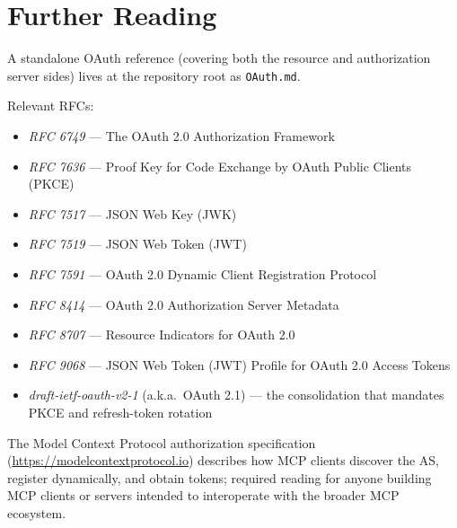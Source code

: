 \section{Further Reading}
\label{sec:as-references}

A standalone OAuth reference (covering both the resource and authorization server sides) lives at the repository root as \texttt{OAuth.md}.

Relevant RFCs:

\begin{itemize}
  \item \emph{RFC 6749} --- The OAuth 2.0 Authorization Framework
  \item \emph{RFC 7636} --- Proof Key for Code Exchange by OAuth Public Clients (PKCE)
  \item \emph{RFC 7517} --- JSON Web Key (JWK)
  \item \emph{RFC 7519} --- JSON Web Token (JWT)
  \item \emph{RFC 7591} --- OAuth 2.0 Dynamic Client Registration Protocol
  \item \emph{RFC 8414} --- OAuth 2.0 Authorization Server Metadata
  \item \emph{RFC 8707} --- Resource Indicators for OAuth 2.0
  \item \emph{RFC 9068} --- JSON Web Token (JWT) Profile for OAuth 2.0 Access Tokens
  \item \emph{draft-ietf-oauth-v2-1} (a.k.a.\ OAuth 2.1) --- the consolidation that mandates PKCE and refresh-token rotation
\end{itemize}

\noindent
The Model Context Protocol authorization specification (\url{https://modelcontextprotocol.io}) describes how MCP clients discover the AS, register dynamically, and obtain tokens; required reading for anyone building MCP clients or servers intended to interoperate with the broader MCP ecosystem.
